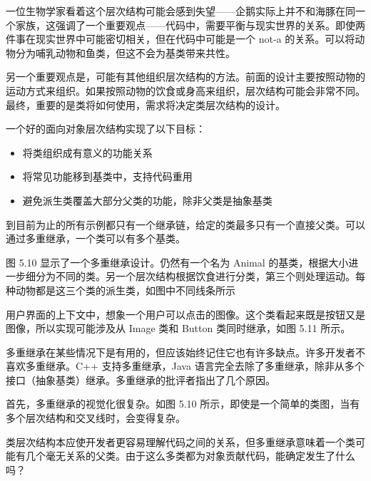 
一位生物学家看着这个层次结构可能会感到失望——企鹅实际上并不和海豚在同一个家族，这强调了一个重要观点——代码中，需要平衡与现实世界的关系。即使两件事在现实世界中可能密切相关，但在代码中可能是一个 not-a 的关系。可以将动物分为哺乳动物和鱼类，但这不会为基类带来共性。

另一个重要观点是，可能有其他组织层次结构的方法。前面的设计主要按照动物的运动方式来组织。如果按照动物的饮食或身高来组织，层次结构可能会非常不同。最终，重要的是类将如何使用，需求将决定类层次结构的设计。

一个好的面向对象层次结构实现了以下目标：

\begin{itemize}
\item
将类组织成有意义的功能关系

\item
将常见功能移到基类中，支持代码重用

\item
避免派生类覆盖大部分父类的功能，除非父类是抽象基类
\end{itemize}


到目前为止的所有示例都只有一个继承链，给定的类最多只有一个直接父类。可以通过多重继承，一个类可以有多个基类。

图 5.10 显示了一个多重继承设计。仍然有一个名为 Animal 的基类，根据大小进一步细分为不同的类。另一个层次结构根据饮食进行分类，第三个则处理运动。每种动物都是这三个类的派生类，如图中不同线条所示


用户界面的上下文中，想象一个用户可以点击的图像。这个类看起来既是按钮又是图像，所以实现可能涉及从 Image 类和 Button 类同时继承，如图 5.11 所示。


多重继承在某些情况下是有用的，但应该始终记住它也有许多缺点。许多开发者不喜欢多重继承。C++ 支持多重继承，Java 语言完全去除了多重继承，除非从多个接口（抽象基类）继承。多重继承的批评者指出了几个原因。

首先，多重继承的视觉化很复杂。如图 5.10 所示，即使是一个简单的类图，当有多个层次结构和交叉线时，会变得复杂。

类层次结构本应使开发者更容易理解代码之间的关系，但多重继承意味着一个类可能有几个毫无关系的父类。由于这么多类都为对象贡献代码，能确定发生了什么吗？

